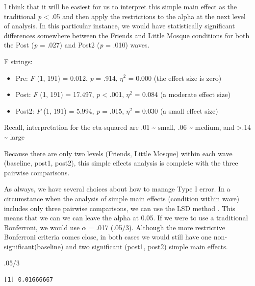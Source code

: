 \documentclass[
  11pt,
]{book}
\newenvironment{Shaded}{\begin{snugshade}}{\end{snugshade}}
\newcommand{\DecValTok}[1]{\textcolor[rgb]{0.00,0.00,0.81}{#1}}
\newcommand{\NormalTok}[1]{#1}
\newcommand{\SpecialCharTok}[1]{\textcolor[rgb]{0.00,0.00,0.00}{#1}}
\providecommand{\tightlist}{%
  \setlength{\itemsep}{0pt}\setlength{\parskip}{0pt}}
\begin{document}
I think that it will be easiest for us to interpret this simple main effect as the traditional \emph{p} \textless{} .05 and then apply the restrictions to the alpha at the next level of analysis. In this particular instance, we would have statistically significant differences somewhere between the Friends and Little Mosque conditions for both the Post (\emph{p} = .027) and Post2 (\emph{p} = .010) waves.

F strings:

\begin{itemize}
\tightlist
\item
  Pre: \emph{F} (1, 191) = 0.012, \emph{p} = .914, \(\eta^{2}\) = 0.000 (the effect size is zero)
\item
  Post: \emph{F} (1, 191) = 17.497, \emph{p} \textless{} .001, \(\eta^{2}\) = 0.084 (a moderate effect size)
\item
  Post2: \emph{F} (1, 191) = 5.994, \emph{p} = .015, \(\eta^{2}\) = 0.030 (a small effect size)
\end{itemize}

Recall, interpretation for the eta-squared are .01 \textasciitilde{} small, .06 \textasciitilde{} medium, and \textgreater.14 \textasciitilde{} large

Because there are only two levels (Friends, Little Mosque) within each wave (baseline, post1, post2), this simple effects analysis is complete with the three pairwise comparisons.

As always, we have several choices about how to manage Type I error. In a circumstance when the analysis of simple main effects (condition within wave) includes only three pairwise comparisons, we can use the LSD method \citep{green_using_2014}. This means that we can we can leave the alpha at 0.05. If we were to use a traditional Bonferroni, we would use \(\alpha\) = .017 (.05/3). Although the more restrictive Bonferroni criteria comes close, in both cases we would still have one non-significant(baseline) and two significant (post1, post2) simple main effects.

\begin{Shaded}
\begin{Highlighting}[]
\NormalTok{.}\DecValTok{05}\SpecialCharTok{/}\DecValTok{3}
\end{Highlighting}
\end{Shaded}

\begin{verbatim}
[1] 0.01666667
\end{verbatim}
\end{document}
